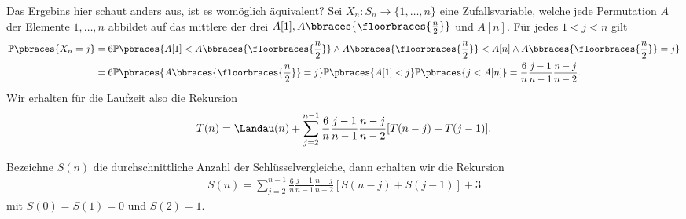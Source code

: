 \begin{solution}
	Das Ergebins hier schaut anders aus, ist es womöglich äquivalent? Sei $X_n: S_n \to \{1, \dots, n\}$ eine Zufallsvariable, welche jede Permutation $A$ der Elemente $1, \dots, n$ abbildet auf das mittlere der drei $A[1], A\bbraces{\floorbraces{\frac{n}{2}}}$ und $A[n]$. Für jedes $1 < j < n$ gilt
	\begin{align*}
		\mathbb{P}\pbraces{X_n = j} &= 6 \mathbb{P}\pbraces{A[1] < A\bbraces{\floorbraces{\frac{n}{2}}} \land A\bbraces{\floorbraces{\frac{n}{2}}} < A[n] \land A\bbraces{\floorbraces{\frac{n}{2}}} = j} \\
		&= 6 \mathbb{P}\pbraces{A\bbraces{\floorbraces{\frac{n}{2}}} = j} \mathbb{P}\pbraces{A[1] < j} \mathbb{P}\pbraces{j < A[n]} = \frac{6}{n}\frac{j - 1}{n - 1}\frac{n - j}{n - 2}.
	\end{align*}
	Wir erhalten für die Laufzeit also die Rekursion
	\begin{align*}
		T(n) = \Landau(n) + \sum_{j=2}^{n-1} \frac{6}{n}\frac{j - 1}{n - 1}\frac{n - j}{n - 2}
		[T(n-j) + T(j - 1)].
	\end{align*}

  Bezeichne $S(n)$ die durchschnittliche Anzahl der Schlüsselvergleiche, dann erhalten wir die Rekursion
  \begin{align*}
    S(n) = \sum_{j=2}^{n-1} \frac{6}{n}\frac{j - 1}{n - 1}\frac{n - j}{n - 2}[S(n-j)+S(j-1)] + 3
  \end{align*}
  mit $S(0) = S(1) = 0$ und $S(2) = 1$.
\end{solution}
